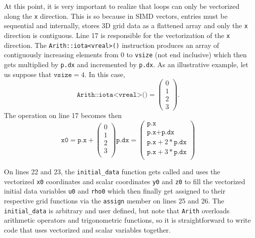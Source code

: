 At this point, it is very important to realize that loops can only be vectorized along the \texttt{x} direction. This is so because in SIMD vectors, entries must be sequential and internally, \CarpetX stores 3D grid data as a flattened array and only the \texttt{x} direction is contiguous. Line 17 is responsible for the vectorization of the \texttt{x} direction. The \texttt{Arith::iota<vreal>()} instruction produces an array of contiguously increasing elements from 0 to \texttt{vsize} (not end inclusive) which then gets multiplied by \texttt{p.dx} and incremented by \texttt{p.dx}. As an illustrative example, let us suppose that $\texttt{vsize} = 4$. In this case, 
%
\begin{equation}
  \texttt{Arith::iota<vreal>()} = 
  \begin{pmatrix}
    0\\
    1\\
    2\\
    3
  \end{pmatrix}
  .
\end{equation}
%
The operation on line 17 becomes then
%
\begin{equation}
  \texttt{x0} = \texttt{p.x} +
  \begin{pmatrix}
    0\\
    1\\
    2\\
    3\\
  \end{pmatrix}
  \texttt{p.dx} =
  \begin{pmatrix}
    \texttt{p.x}\\
    \texttt{p.x} + \texttt{p.dx}\\
    \texttt{p.x} + 2 * \texttt{p.dx}\\
    \texttt{p.x} + 3 * \texttt{p.dx}\\
  \end{pmatrix}
\end{equation}

On lines 22 and 23, the \texttt{initial\_data} function gets called and uses the vectorized \texttt{x0} coordinates and scalar coordinates \texttt{y0} and \texttt{z0} to fill the vectorized initial data variables \texttt{u0} and \texttt{rho0} which then finally get assigned to their respective grid functions via the \texttt{assign} member on lines 25 and 26. The \texttt{initial\_data} is arbitrary and user defined, but note that \texttt{Arith} overloads arithmetic operators and trigonometric functions, so it is straightforward to write code that uses vectorized and scalar variables together. 

